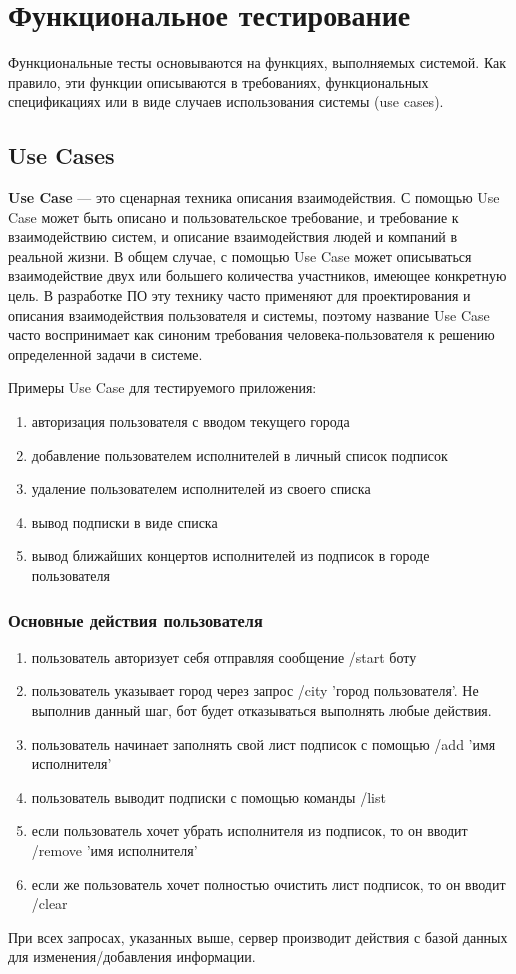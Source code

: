 \chapter{Функциональное тестирование}

Функциональные тесты основываются на функциях, выполняемых системой. Как правило, эти функции описываются в требованиях, функциональных спецификациях или в виде случаев использования системы (use cases).

\section{Use Cases}

\textbf{Use Case} — это сценарная техника описания взаимодействия. С помощью Use Case может быть описано и пользовательское требование, и требование к взаимодействию систем, и описание взаимодействия людей и компаний в реальной жизни. В общем случае, с помощью Use Case может описываться взаимодействие двух или большего количества участников, имеющее конкретную цель. В разработке ПО эту технику часто применяют для проектирования и описания взаимодействия пользователя и системы, поэтому название Use Case часто воспринимает как синоним требования человека-пользователя к решению определенной задачи в системе.


Примеры Use Case для тестируемого приложения:
\begin{enumerate}
	\item авторизация пользователя с вводом текущего города
	\item добавление пользователем исполнителей в личный список подписок
	\item удаление пользователем исполнителей из своего списка
	\item вывод подписки в виде списка
	\item вывод ближайших концертов исполнителей из подписок в городе пользователя
\end{enumerate}

\subsection{Основные действия пользователя }

\begin{enumerate}
	\item пользователь авторизует себя отправляя сообщение /start боту
	\item пользователь указывает город через запрос /city 'город пользователя'. Не выполнив данный шаг, бот будет отказываться выполнять любые действия.
	\item пользователь начинает заполнять свой лист подписок с помощью /add 'имя исполнителя'
	\item пользователь выводит подписки с помощью команды /list
	\item если пользователь хочет убрать исполнителя из подписок, то он вводит /remove 'имя исполнителя'
	\item если же пользователь хочет полностью очистить лист подписок, то он вводит /clear 
\end{enumerate}
При всех запросах, указанных выше, сервер производит действия с базой данных для изменения/добавления информации. 

